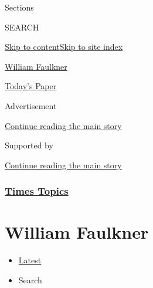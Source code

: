 Sections

SEARCH

\protect\hyperlink{site-content}{Skip to
content}\protect\hyperlink{site-index}{Skip to site index}

\href{https://www.nytimes3xbfgragh.onion/topic/person/william-faulkner}{William
Faulkner}

\href{https://myaccount.nytimes3xbfgragh.onion/auth/login?response_type=cookie\&client_id=vi}{}

\href{https://www.nytimes3xbfgragh.onion/section/todayspaper}{Today's
Paper}

Advertisement

\protect\hyperlink{after-top}{Continue reading the main story}

Supported by

\protect\hyperlink{after-sponsor}{Continue reading the main story}

\hypertarget{times-topics}{%
\subsubsection{\texorpdfstring{\href{/index.html}{Times
Topics}}{Times Topics}}\label{times-topics}}

\hypertarget{william-faulkner}{%
\section{William Faulkner}\label{william-faulkner}}

\begin{itemize}
\tightlist
\item
  \protect\hyperlink{stream-panel}{Latest}
\item
  Search
\end{itemize}

